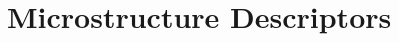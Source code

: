 % 
%





\renewcommand{\chabbr}{MICROD}

\chapterimage{\noheaderimage}

\chapter{Microstructure Descriptors}\label{\chabbr:MicrostructureDescriptors} %

